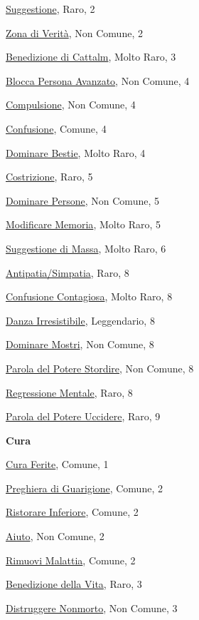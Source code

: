 \begin{multicols}{3}
{{\hyperlink{Suggestione}{Suggestione}, Raro, 2

\hyperlink{Zona di Verità}{Zona di Verità}, Non Comune, 2

\hyperlink{Benedizione di Cattalm}{Benedizione di Cattalm}, Molto Raro, 3

\hyperlink{Blocca Persona Avanzato}{Blocca Persona Avanzato}, Non Comune, 4

\hyperlink{Compulsione}{Compulsione}, Non Comune, 4

\hyperlink{Confusione}{Confusione}, Comune, 4

\hyperlink{Dominare Bestie}{Dominare Bestie}, Molto Raro, 4

\hyperlink{Costrizione}{Costrizione}, Raro, 5

\hyperlink{Dominare Persone}{Dominare Persone}, Non Comune, 5

\hyperlink{Modificare Memoria}{Modificare Memoria}, Molto Raro, 5

\hyperlink{Suggestione di Massa}{Suggestione di Massa}, Molto Raro, 6

\hyperlink{Antipatia/Simpatia}{Antipatia/Simpatia}, Raro, 8

\hyperlink{Confusione Contagiosa}{Confusione Contagiosa}, Molto Raro, 8

\hyperlink{Danza Irresistibile}{Danza Irresistibile}, Leggendario, 8

\hyperlink{Dominare Mostri}{Dominare Mostri}, Non Comune, 8

\hyperlink{Parola del Potere Stordire}{Parola del Potere Stordire}, Non Comune, 8

\hyperlink{Regressione Mentale}{Regressione Mentale}, Raro, 8

\hyperlink{Parola del Potere Uccidere}{Parola del Potere Uccidere}, Raro, 9

\medskip\textbf{Cura}

\hyperlink{Cura Ferite}{Cura Ferite}, Comune, 1

\hyperlink{Preghiera di Guarigione}{Preghiera di Guarigione}, Comune, 2

\hyperlink{Ristorare Inferiore}{Ristorare Inferiore}, Comune, 2

\hyperlink{Aiuto}{Aiuto}, Non Comune, 2

\hyperlink{Rimuovi Malattia}{Rimuovi Malattia}, Comune, 2

\hyperlink{Benedizione della Vita}{Benedizione della Vita}, Raro, 3

\hyperlink{Distruggere nonmorto}{Distruggere Nonmorto}, Non Comune, 3

}}
\end{multicols}
